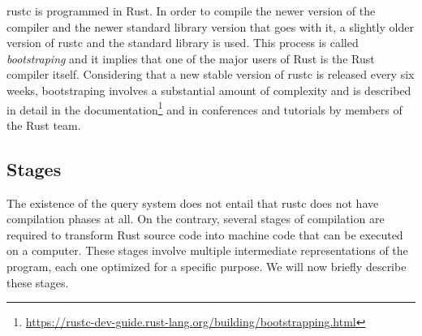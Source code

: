 \documentclass[../Thesis.tex]{subfiles}
\begin{document}
rustc is programmed in Rust.
In order to compile the newer version of the compiler
and the newer standard library version that goes with it,
a slightly older version of rustc and the standard library is used.
This process is called \emph{bootstraping} and it implies
that one of the major users of Rust is the Rust compiler itself.
Considering that a new stable version of rustc is released every six weeks,
bootstraping involves a substantial amount of complexity and is described
in detail in the documentation\footnote{\url{https://rustc-dev-guide.rust-lang.org/building/bootstrapping.html}}
and in conferences \cite{nelson2022} and tutorials \cite{klock2022} by members of the Rust team.

\subsection{Stages}

The existence of the query system does not entail
that rustc does not have compilation phases at all.
On the contrary, several stages of compilation are required
to transform Rust source code into machine code that can be executed on a computer.
These stages involve multiple intermediate representations of the program,
each one optimized for a specific purpose.
We will now briefly describe these stages.
\end{document}
